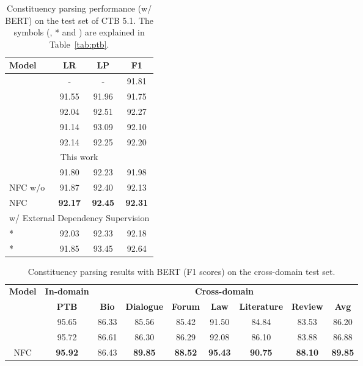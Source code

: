 \documentclass[11pt]{article}
\begin{document}
\begin{table}[t!]
\centering
    \begin{adjustbox}{max width=1.0\columnwidth}
    \begin{tabular}{lccc}
    \hline
        {\bf Model} & {\bf LR} & {\bf LP} & {\bf F1} \\
        \hline
\citet{liu-zhang-2017-order}  & - & - & 91.81 \\
        \citet{san-constituency} & 91.55 & 91.96 & 91.75 \\
        \citet{constituency-crf} & 92.04 & 92.51 & 92.27 \\
\citet{head-driven}  & 91.14 & 93.09 & 92.10 \\
        \citet{span-attention} & 92.14 & 92.25 & 92.20 \\
        \hline
        \multicolumn{4}{c}{This work} \\
        \hline
        \citet{san-constituency}  & 91.80 & 92.23 & 91.98 \\
        NFC w/o  & 91.87 & 92.40 & 92.13 \\
NFC & {\bf 92.17} & {\bf 92.45} & {\bf 92.31} \\
        \hline
        \multicolumn{4}{c}{w/ External Dependency Supervision} \\
        \hline
        \citet{head-driven} * & 92.03 & 92.33 & 92.18 \\
        \citet{label-attention-parsing}* & 91.85 & 93.45 & 92.64 \\
        
\hline
    \end{tabular}
    \end{adjustbox}
    \caption{Constituency parsing performance (w/ BERT) on the test set of CTB 5.1. The symbols (, * and ) are explained in Table~\ref{tab:ptb}.}
    \label{tab:ctb}
\end{table}

\begin{table*}[th!]
    \fontsize{10}{12}\selectfont
    \centering
    \begin{tabular}{c|c|cccccc|c}
\hline
\multirow{2}{*}{\bf Model} & {\bf In-domain} &  & \multicolumn{5}{c}{\bf Cross-domain} \\
        \cline{2-9}
         & \bf PTB & \bf Bio & \bf Dialogue & \bf Forum &\bf Law & \bf Literature & \bf Review & \bf Avg \\
        \hline
        \citet{liu-zhang-2017-order}     & 95.65 & 86.33 & 85.56 & 85.42 & 91.50 & 84.84 & 83.53 & 86.20\\
\citet{san-constituency}         & 95.72 & 86.61 & 86.30 & 86.29 & 92.08 & 86.10 & 83.88 & 86.88 \\
    \hline
        NFC & {\bf 95.92} & 86.43 & {\bf 89.85} & {\bf 88.52} & {\bf 95.43} & {\bf 90.75} & {\bf 88.10} & {\bf 89.85} \\
\hline
    \end{tabular}
    \caption{Constituency parsing results with BERT (F1 scores) on the cross-domain test set. }
    \label{tab:cross-domain}
\end{table*}
\end{document}
